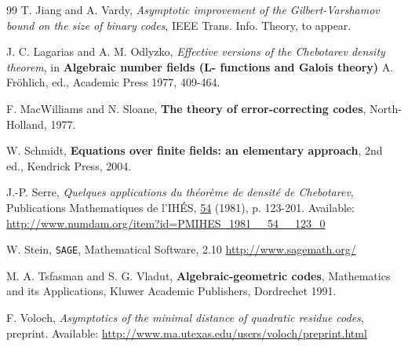 \documentclass[submission%
]{dmtcs}
\begin{document}
\begin{thebibliography}{99}
 T. Jiang and A. Vardy,
{\it Asymptotic improvement of the Gilbert-Varshamov
bound on the size of binary codes}, IEEE Trans. Info. Theory, to appear.

J. C. Lagarias and A. M. Odlyzko,
{\it Effective versions of the Chebotarev density theorem},
in {\bf Algebraic number fields (L- functions and Galois theory)}
A. Fr\"ohlich, ed., Academic Press 1977, 409-464.



F. MacWilliams and N. Sloane, {\bf The theory of error-correcting codes},
North-Holland, 1977.

 W. Schmidt, {\bf Equations over finite fields: 
an elementary approach}, 2nd ed., Kendrick Press, 2004.

J.-P. Serre, {\it Quelques applications du th\'eor\`eme de densit\'e 
de Chebotarev}, Publications Mathematiques de l'IH\'ES, 
\underline{54} (1981), p. 123-201.  Available:
\newline
\url{http://www.numdam.org/item?id=PMIHES_1981__54__123_0}


 W. Stein, {\tt SAGE}, Mathematical Software, 2.10
\newline
\url{http://www.sagemath.org/}

M. A. Tsfasman and S. G. Vladut, {\bf Algebraic-geometric codes},
Mathematics and its Applications, Kluwer Academic Publishers, Dordrechet
1991.

 F. Voloch, {\it Asymptotics of the minimal distance 
of quadratic residue codes}, preprint. Available:
\url{http://www.ma.utexas.edu/users/voloch/preprint.html}


\end{thebibliography}
\end{document}
